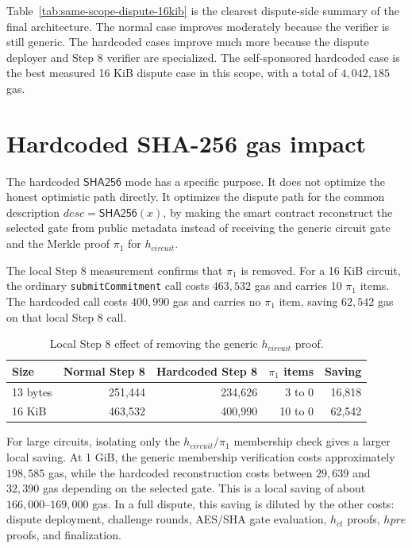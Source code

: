Table~\ref{tab:same-scope-dispute-16kib} is the clearest dispute-side summary of the final
architecture. The normal case improves moderately because the verifier is still generic.
The hardcoded cases improve much more because the dispute deployer and Step 8 verifier are
specialized. The self-sponsored hardcoded case is the best measured 16 KiB dispute case in
this scope, with a total of \(4,042,185\) gas.

\section{Hardcoded SHA-256 gas impact}

The hardcoded \(\mathsf{SHA256}\) mode has a specific purpose. It does not optimize the
honest optimistic path directly. It optimizes the dispute path for the common description
\(desc=\mathsf{SHA256}(x)\), by making the smart contract reconstruct the selected gate
from public metadata instead of receiving the generic circuit gate and the Merkle proof
\(\pi_1\) for \(h_{\mathit{circuit}}\).

The local Step 8 measurement confirms that \(\pi_1\) is removed. For a 16 KiB circuit, the
ordinary \texttt{submitCommitment} call costs \(463,532\) gas and carries 10 \(\pi_1\)
items. The hardcoded call costs \(400,990\) gas and carries no \(\pi_1\) item, saving
\(62,542\) gas on that local Step 8 call.

\begin{table}[htbp]
  \centering
  \begin{tabular}{lrrrr}
    \toprule
    Size & Normal Step 8 & Hardcoded Step 8 & \(\pi_1\) items & Saving \\
    \midrule
    13 bytes & 251,444 & 234,626 & 3 to 0 & 16,818 \\
    16 KiB & 463,532 & 400,990 & 10 to 0 & 62,542 \\
    \bottomrule
  \end{tabular}
  \caption{Local Step 8 effect of removing the generic \(h_{\mathit{circuit}}\) proof.}
  \label{tab:hardcoded-step8-local}
\end{table}

For large circuits, isolating only the \(h_{\mathit{circuit}}/\pi_1\) membership check gives
a larger local saving. At 1 GiB, the generic membership verification costs approximately
\(198,585\) gas, while the hardcoded reconstruction costs between \(29,639\) and \(32,390\)
gas depending on the selected gate. This is a local saving of about \(166,000\)--\(169,000\)
gas. In a full dispute, this saving is diluted by the other costs: dispute deployment,
challenge rounds, AES/SHA gate evaluation, \(h_{\mathit{ct}}\) proofs, \(hpre\) proofs, and
finalization.

